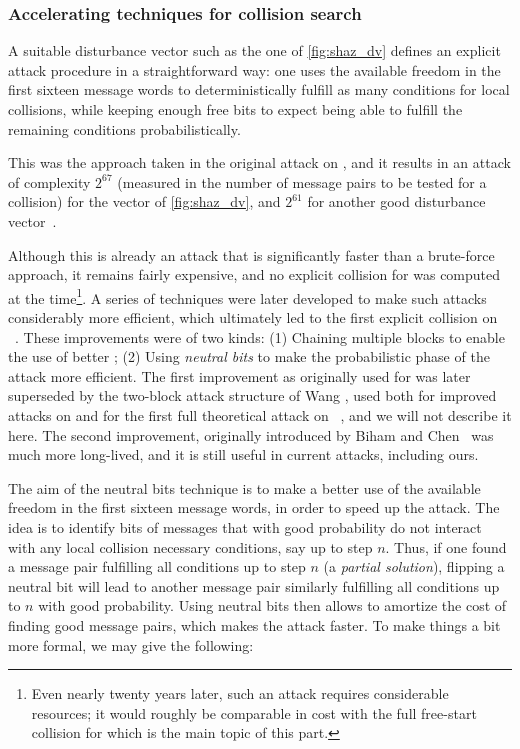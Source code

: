 \subsubsection{Accelerating techniques for collision search}
\label{sec:acc_techs_sha0}

A suitable disturbance vector such as the one of \autoref{fig:shaz_dv} defines an explicit attack procedure in a straightforward way: one uses the available freedom in the first
sixteen message words to deterministically fulfill as many conditions for local collisions, while keeping enough free bits to expect being able to fulfill the remaining conditions
probabilistically.

This was the approach taken in the original attack on \shazero, and it results in an attack of complexity $2^{67}$ (measured in the number of message pairs to be tested for a collision)
for the vector of \autoref{fig:shaz_dv}, and $2^{61}$ for another good disturbance vector~\cite{DBLP:conf/crypto/ChabaudJ98}.

Although this is already an attack that is significantly faster than a brute-force approach, it remains fairly expensive, and no explicit collision for \shazero was computed at the time\footnote{Even
nearly twenty years later, such an attack requires considerable resources; it would roughly be comparable in cost with the full free-start collision for \shaone which is the main topic of
this part.}.
A series of techniques were later developed to make such attacks considerably more efficient, which ultimately led to the first explicit collision on \shazero~\cite{DBLP:conf/eurocrypt/BihamCJCLJ05}.
These improvements were of two kinds: (1) Chaining multiple blocks to enable the use of better \dvs; (2) Using \emph{neutral bits} to make the probabilistic phase of the attack more efficient.
The first improvement as originally used for \shazero was later superseded by the two-block attack structure of Wang \etal, used both for improved attacks on \shazero
and for the first full theoretical attack on \shaone~\cite{DBLP:conf/crypto/WangYY05,DBLP:conf/crypto/WangYY05a},
and we will not describe it here. The second improvement,
originally introduced by Biham and Chen~\cite{DBLP:conf/crypto/BihamC04} was much more long-lived, and it is still useful in current attacks, including ours.

The aim of the neutral bits technique is to make a better use of the available freedom in the first sixteen message words, in order to speed up the attack. The idea is to identify bits
of messages that with good probability do not interact with any local collision necessary conditions, say up to step $n$. Thus, if one found a message pair fulfilling all conditions
up to step $n$ (a \emph{partial solution}), flipping a neutral bit will lead to another message pair similarly fulfilling all conditions up to $n$ with good probability. Using neutral bits then allows to amortize
the cost of finding good message pairs, which makes the attack faster. To make things a bit more formal, we may give the following:


